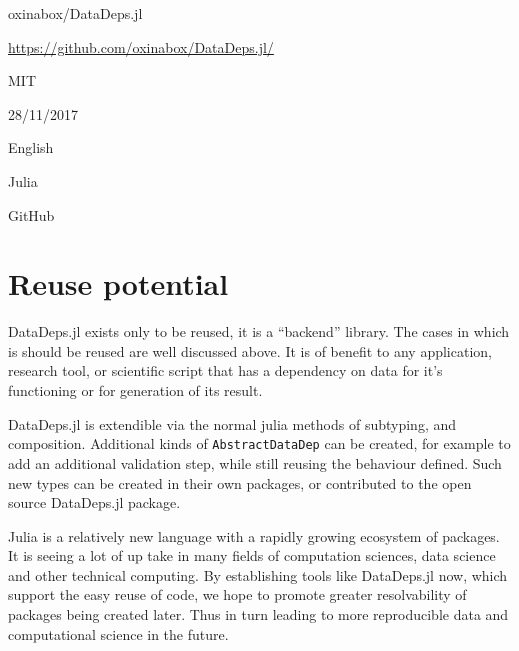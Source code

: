 \documentclass[dvinames]{josr}
\begin{document}
\begin{description}[noitemsep,topsep=0pt]
	\item[Name:] oxinabox/DataDeps.jl
	\item[Persistent identifier:] \url{https://github.com/oxinabox/DataDeps.jl/}
	\item[Licence:] MIT
	\item[Date published:] 28/11/2017
	\item[Documentation Language] English
	\item[Programming Language] Julia
	\item[Code repository] GitHub
\end{description}


\section{Reuse potential}

DataDeps.jl exists only to be reused, it is a ``backend'' library.
The cases in which is should be reused are well discussed above.
It is of benefit to any application, research tool, or scientific script that has a dependency on data for it's functioning or for generation of its result.

DataDeps.jl is extendible via the normal julia methods of subtyping, and composition.
Additional kinds of \texttt{AbstractDataDep} can be created, for example to add an additional validation step, while still reusing the behaviour defined.
Such new types can be created in their own packages, or contributed to the open source DataDeps.jl package.


Julia is a relatively new language with a rapidly growing ecosystem of packages.
It is seeing a lot of up take in many fields of computation sciences, data science and other technical computing.
By establishing tools like DataDeps.jl now, which support the easy reuse of code,
we hope to promote greater resolvability of packages being created later.
Thus in turn leading to more reproducible data and computational science in the future.
\end{document}
